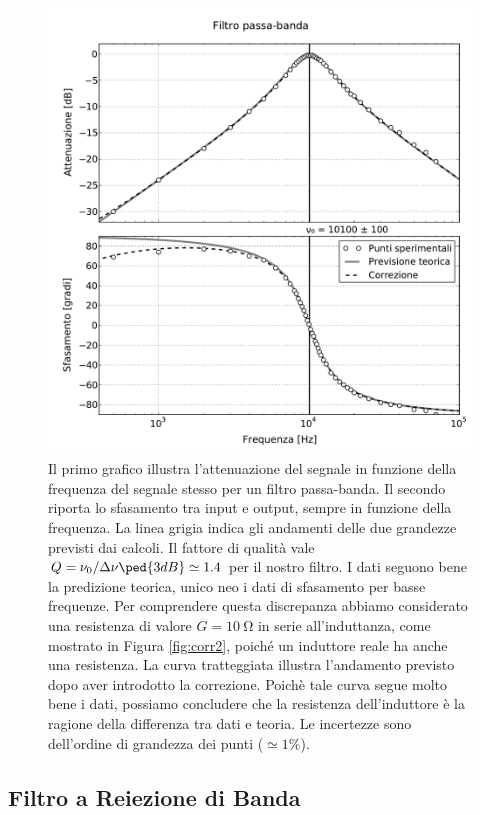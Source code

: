 \begin{figure}
  \includegraphics[scale=0.55]{passa_banda.pdf}
  \caption{Il primo grafico illustra l'attenuazione del segnale in funzione della frequenza del segnale stesso
    per un filtro passa-banda.
    Il secondo riporta lo sfasamento tra input e output, sempre in funzione della frequenza. La linea grigia indica
    gli andamenti delle due grandezze previsti dai calcoli. Il fattore di qualità vale
    $Q = \nu_0/\Delta \nu\ped{3dB} \simeq 1.4$ per il nostro filtro. I dati seguono bene la predizione teorica,
    unico neo i dati di sfasamento per basse frequenze. Per comprendere questa discrepanza abbiamo considerato una
    resistenza di valore $G = \SI{10}{\ohm}$ in serie all'induttanza, come mostrato in Figura \ref{fig:corr2},
    poiché un induttore reale ha anche una resistenza. La curva tratteggiata illustra l'andamento previsto dopo aver introdotto la
    correzione. Poichè tale curva segue molto bene i dati, possiamo concludere che la resistenza dell'induttore è
    la ragione della differenza tra dati e teoria.
    Le incertezze sono dell'ordine di grandezza dei punti ($\simeq 1\%$).}
  \label{fig:g_banda}
\end{figure}

\subsection*{Filtro a Reiezione di Banda}

